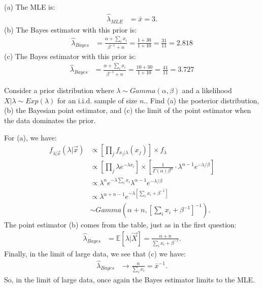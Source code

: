 (a) The MLE is:
\begin{align*}
\hat{\lambda}_{MLE} &= \bar{x} = 3.
\end{align*}
(b) The Bayes estimator with this prior is:
\begin{align*}
\hat{\lambda}_{Bayes} &= \frac{\alpha + \sum_i x_i}{\beta^{-1} + n} = \frac{1 + 30}{1 + 10} = \frac{31}{11} = 2.818
\end{align*}
(c) The Bayes estimator with this prior is:
\begin{align*}
\hat{\lambda}_{Bayes} &= \frac{\alpha + \sum_i x_i}{\beta^{-1} + n} = \frac{10 + 30}{1 + 10} = \frac{41}{11} = 3.727
\end{align*}


Consider a prior distribution where $\lambda \sim Gamma(\alpha, \beta)$ and a 
likelihood $X|\lambda \sim Exp(\lambda)$ for an i.i.d. sample of size $n$..
Find (a) the posterior distribution, (b) the Bayesian point estimator, and (c) the
limit of the point estimator when the data dominates the prior.


For (a), we have:
\begin{align*}
f_{\lambda | \vec{x}}(\lambda | \vec{x}) 
&\propto \left[ \prod_j f_{x_j|\lambda}(x_j) \right] \times f_{\lambda} \\
&\propto \left[ \prod_j \lambda e^{-\lambda x_i} \right] \times \left[ \frac{1}{\Gamma(\alpha) \beta^{\alpha}} \cdot \lambda^{\alpha - 1} e^{-\lambda/\beta} \right] \\
&\propto \lambda^n e^{-\lambda \sum_i x_i} \lambda^{\alpha - 1} e^{-\lambda/\beta} \\
&\propto \lambda^{\alpha + n - 1} e^{-\lambda [\sum_i x_i + \beta^{-1}]} \\
&\sim Gamma(\alpha + n, [\sum_i x_i + \beta^{-1}]^{-1}).
\end{align*}
The point estimator (b) comes from the table, just as in the first question:
\begin{align*}
\hat{\lambda}_{Bayes} &= \mathbb{E}[ \lambda | \vec{X} ] = \frac{\alpha + n}{\sum_i x_i + \beta^{-1}}.
\end{align*}
Finally, in the limit of large data, we see that (c) we have:
\begin{align*}
\hat{\lambda}_{Bayes} &\rightarrow \frac{n}{\sum_i x_i} = \bar{x}^{-1}.
\end{align*}
So, in the limit of large data, once again the Bayes estimator limits to the MLE.

